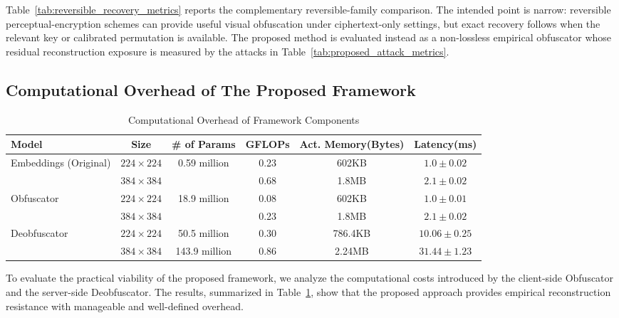 \documentclass{ieeeaccess}
\newcommand{\rev}[1]{{\color{green}#1}}
\begin{document}
\rev{Table~\ref{tab:reversible_recovery_metrics} reports the complementary reversible-family comparison. The intended point is narrow: reversible perceptual-encryption schemes can provide useful visual obfuscation under ciphertext-only settings, but exact recovery follows when the relevant key or calibrated permutation is available. The proposed method is evaluated instead as a non-lossless empirical obfuscator whose residual reconstruction exposure is measured by the attacks in Table~\ref{tab:proposed_attack_metrics}.}


\subsection{Computational Overhead of The Proposed Framework}

\begin{table}[t!]
\centering
\caption{Computational Overhead of Framework Components}
\label{tab:overheads}
\begin{tabular}{l c c c c c}
\toprule
\textbf{Model} & \textbf{Size} & \textbf{\# of Params} & \textbf{GFLOPs} & \textbf{Act. Memory}(Bytes) & \textbf{Latency}(ms) \\
\midrule
\multirow{2}{*}{Embeddings (Original)}      & $224\times224$           &  \multirow{2}{*}{0.59 million}  & 0.23 & 602KB  & $1.0 \pm 0.02$  \\
     & $384\times384$           &    & 0.68 &  1.8MB  & $2.1 \pm 0.02$  \\
\midrule
\multirow{2}{*}{Obfuscator}      & $224\times224$           &  \multirow{2}{*}{18.9 million}  & 0.08 & 602KB  & $1.0 \pm 0.01$  \\
     & $384\times384$           &    & 0.23 &  1.8MB  & $2.1 \pm 0.02$  \\
\midrule
\multirow{2}{*}{Deobfuscator}      & $224\times224$           &  50.5 million  & 0.30 & 786.4KB  & $10.06 \pm 0.25$  \\
     & $384\times384$           &  143.9 million  & 0.86 &  2.24MB  &  $31.44 \pm 1.23$ \\

\bottomrule
\end{tabular}
\end{table}

\rev{To evaluate the practical viability of the proposed framework, we analyze the computational costs introduced by the client-side Obfuscator and the server-side Deobfuscator. The results, summarized in Table~\ref{tab:overheads}, show that the proposed approach provides empirical reconstruction resistance with manageable and well-defined overhead.}
\end{document}
